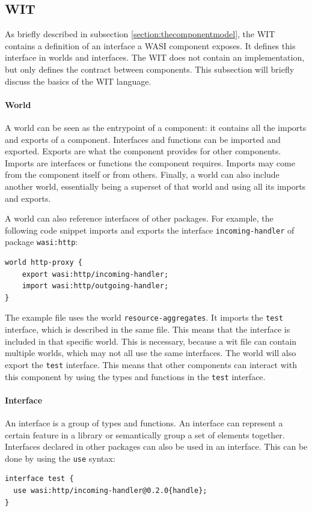 \subsection{\acrfull{WIT}}
\label{section:WIT}

As briefly described in subsection \ref{section:thecomponentmodel}, the \acrfull{WIT} contains a definition of an interface a \acrshort{WASI} component exposes. It defines this interface in worlds and interfaces. The \acrshort{WIT} does not contain an implementation, but only defines the contract between components. This subsection will briefly discuss the basics of the \acrshort{WIT} language.

\paragraph{World}
A world can be seen as the entrypoint of a component: it contains all the imports and exports of a component. Interfaces and functions can be imported and exported. Exports are what the component provides for other components. Imports are interfaces or functions the component requires. Imports may come from the component itself or from others. Finally, a world can also include another world, essentially being a superset of that world and using all its imports and exports.

A world can also reference interfaces of other packages. For example, the following code snippet imports and exports the interface \texttt{incoming-handler} of package \texttt{wasi:http}:
\begin{verbatim}
world http-proxy {
    export wasi:http/incoming-handler;
    import wasi:http/outgoing-handler;
}
\end{verbatim}

The example file uses the world \texttt{resource-aggregates}. It imports the \texttt{test} interface, which is described in the same file. This means that the interface is included in that specific world. This is necessary, because a wit file can contain multiple worlds, which may not all use the same interfaces. The world will also export the \texttt{test} interface. This means that other components can interact with this component by using the types and functions in the \texttt{test} interface.

\paragraph{Interface}
An interface is a group of types and functions. An interface can represent a certain feature in a library or semantically group a set of elements together. Interfaces declared in other packages can also be used in an interface. This can be done by using the \texttt{use} syntax:
\begin{verbatim}
interface test {
  use wasi:http/incoming-handler@0.2.0{handle};
}
\end{verbatim}

